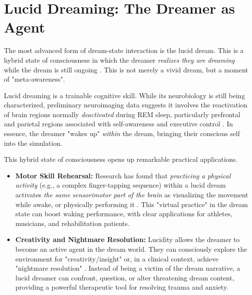 \section{Lucid Dreaming: The Dreamer as Agent}\label{sec:lucid_dreaming}

The most advanced form of dream-state interaction is the lucid dream. This is a hybrid state of consciousness in which the dreamer \textit{realizes they are dreaming} while the dream is still ongoing \citep{voss2009lucid}. This is not merely a vivid dream, but a moment of "meta-awareness".

Lucid dreaming is a trainable cognitive skill. While its neurobiology is still being characterized, preliminary neuroimaging data suggests it involves the reactivation of brain regions normally \textit{deactivated} during REM sleep, particularly prefrontal and parietal regions associated with self-awareness and executive control \citep{voss2009lucid}. In essence, the dreamer "wakes up" \textit{within} the dream, bringing their conscious self into the simulation.

This hybrid state of consciousness opens up remarkable practical applications.
\begin{itemize}
    \item \textbf{Motor Skill Rehearsal:} Research has found that \textit{practicing a physical activity} (e.g., a complex finger-tapping sequence) within a lucid dream activates \textit{the same sensorimotor part of the brain} as visualizing the movement while awake, or physically performing it \citep{dresler2011motor}. This "virtual practice" in the dream state can boost waking performance, with clear applications for athletes, musicians, and rehabilitation patients.
    \item \textbf{Creativity and Nightmare Resolution:} Lucidity allows the dreamer to become an active agent in the dream world. They can consciously explore the environment for "creativity/insight" or, in a clinical context, achieve "nightmare resolution" \citep{voss2009lucid}. Instead of being a victim of the dream narrative, a lucid dreamer can confront, question, or alter threatening dream content, providing a powerful therapeutic tool for resolving trauma and anxiety.
\end{itemize}
